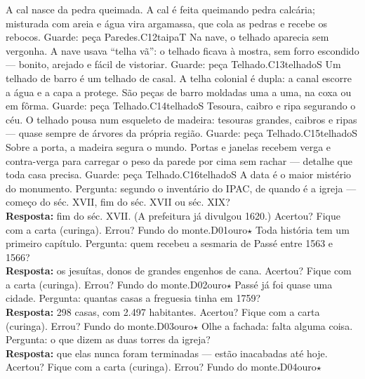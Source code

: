 \linhacartas
{
{A cal nasce da pedra queimada.}
{A cal é feita queimando pedra calcária; misturada com areia e água vira argamassa, que cola as pedras e recebe os rebocos.}
{Guarde: peça Paredes.}{C12}{taipa}{T}}
{
{Na nave, o telhado aparecia sem vergonha.}
{A nave usava ``telha vã'': o telhado ficava à mostra, sem forro escondido --- bonito, arejado e fácil de vistoriar.}
{Guarde: peça Telhado.}{C13}{telhado}{S}}
{
{Um telhado de barro é um telhado de casal.}
{A telha colonial é dupla: a canal escorre a água e a capa a protege. São peças de barro moldadas uma a uma, na coxa ou em fôrma.}
{Guarde: peça Telhado.}{C14}{telhado}{S}}
\linhacartas
{
{Tesoura, caibro e ripa segurando o céu.}
{O telhado pousa num esqueleto de madeira: tesouras grandes, caibros e ripas --- quase sempre de árvores da própria região.}
{Guarde: peça Telhado.}{C15}{telhado}{S}}
{
{Sobre a porta, a madeira segura o mundo.}
{Portas e janelas recebem verga e contra-verga para carregar o peso da parede por cima sem rachar --- detalhe que toda casa precisa.}
{Guarde: peça Telhado.}{C16}{telhado}{S}}
{
{A data é o maior mistério do monumento.}
{Pergunta: segundo o inventário do IPAC, de quando é a igreja --- começo do séc. XVII, fim do séc. XVII ou séc. XIX?\\ \textbf{Resposta:} fim do séc. XVII. (A prefeitura já divulgou 1620.)}
{Acertou? Fique com a carta (curinga). Errou? Fundo do monte.}{D01}{ouro}{$\star$}}
\linhacartas
{
{Toda história tem um primeiro capítulo.}
{Pergunta: quem recebeu a sesmaria de Passé entre 1563 e 1566?\\ \textbf{Resposta:} os jesuítas, donos de grandes engenhos de cana.}
{Acertou? Fique com a carta (curinga). Errou? Fundo do monte.}{D02}{ouro}{$\star$}}
{
{Passé já foi quase uma cidade.}
{Pergunta: quantas casas a freguesia tinha em 1759?\\ \textbf{Resposta:} 298 casas, com 2.497 habitantes.}
{Acertou? Fique com a carta (curinga). Errou? Fundo do monte.}{D03}{ouro}{$\star$}}
{
{Olhe a fachada: falta alguma coisa.}
{Pergunta: o que dizem as duas torres da igreja?\\ \textbf{Resposta:} que elas nunca foram terminadas --- estão inacabadas até hoje.}
{Acertou? Fique com a carta (curinga). Errou? Fundo do monte.}{D04}{ouro}{$\star$}}
\newpage

